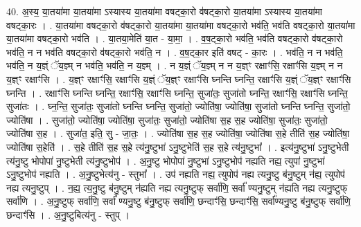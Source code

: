 \documentclass[17pt]{extarticle}
\begin{document}
40. अ॒स्य॒ या॒तया॑मा या॒तया॑मा ऽस्यास्य या॒तया॑मा वषट्का॒रो व॑षट्का॒रो या॒तया॑मा ऽस्यास्य या॒तया॑मा वषट्का॒रः । . या॒तया॑मा वषट्का॒रो व॑षट्का॒रो या॒तया॑मा या॒तया॑मा वषट्का॒रो भव॑ति॒ भव॑ति वषट्का॒रो या॒तया॑मा या॒तया॑मा वषट्का॒रो भव॑ति । . या॒तया॒मेति॑ या॒त - या॒मा॒ । . व॒ष॒ट्का॒रो भव॑ति॒ भव॑ति वषट्का॒रो व॑षट्का॒रो भव॑ति॒ न न भव॑ति वषट्का॒रो व॑षट्का॒रो भव॑ति॒ न । . व॒ष॒ट्का॒र इति॑ वषट् - का॒रः । . भव॑ति॒ न न भव॑ति॒ भव॑ति॒ न य॒ज्ञ्ं ॅय॒ज्ञ्म् न भव॑ति॒ भव॑ति॒ न य॒ज्ञ्म् । . न य॒ज्ञ्ं ॅय॒ज्ञ्म् न न य॒ज्ञ्ꣳ रक्षाꣳ॑सि॒ रक्षाꣳ॑सि य॒ज्ञ्म् न न य॒ज्ञ्ꣳ रक्षाꣳ॑सि । . य॒ज्ञ्ꣳ रक्षाꣳ॑सि॒ रक्षाꣳ॑सि य॒ज्ञ्ं ॅय॒ज्ञ्ꣳ रक्षाꣳ॑सि घ्नन्ति घ्नन्ति॒ रक्षाꣳ॑सि य॒ज्ञ्ं ॅय॒ज्ञ्ꣳ रक्षाꣳ॑सि घ्नन्ति । . रक्षाꣳ॑सि घ्नन्ति घ्नन्ति॒ रक्षाꣳ॑सि॒ रक्षाꣳ॑सि घ्नन्ति॒ सुजा॑तः॒ सुजा॑तो घ्नन्ति॒ रक्षाꣳ॑सि॒ रक्षाꣳ॑सि घ्नन्ति॒ सुजा॑तः । . घ्न॒न्ति॒ सुजा॑तः॒ सुजा॑तो घ्नन्ति घ्नन्ति॒ सुजा॑तो॒ ज्योति॑षा॒ ज्योति॑षा॒ सुजा॑तो घ्नन्ति घ्नन्ति॒ सुजा॑तो॒ ज्योति॑षा । . सुजा॑तो॒ ज्योति॑षा॒ ज्योति॑षा॒ सुजा॑तः॒ सुजा॑तो॒ ज्योति॑षा स॒ह स॒ह ज्योति॑षा॒ सुजा॑तः॒ सुजा॑तो॒ ज्योति॑षा स॒ह । . सुजा॑त॒ इति॒ सु - जा॒तः॒ । . ज्योति॑षा स॒ह स॒ह ज्योति॑षा॒ ज्योति॑षा स॒हे तीति॑ स॒ह ज्योति॑षा॒ ज्योति॑षा स॒हेति॑ । . स॒हे तीति॑ स॒ह स॒हे त्य॑नु॒ष्टुभा॑ ऽनु॒ष्टुभेति॑ स॒ह स॒हे त्य॑नु॒ष्टुभा᳚ । . इत्य॑नु॒ष्टुभा॑ ऽनु॒ष्टुभेती त्य॑नु॒ष्टु भोपोपा॑ नु॒ष्टुभेती त्य॑नु॒ष्टुभोप॑ । . अ॒नु॒ष्टु भोपोपा॑ नु॒ष्टुभा॑ ऽनु॒ष्टुभोप॑ नह्यति नह्य॒ त्युपा॑ नु॒ष्टुभा॑ ऽनु॒ष्टुभोप॑ नह्यति । . अ॒नु॒ष्टुभेत्य॑नु - स्तुभा᳚ । . उप॑ नह्यति नह्य॒ त्युपोप॑ नह्य त्यनु॒ष्टु ब॑नु॒ष्टुम् न॑ह्य॒ त्युपोप॑ नह्य त्यनु॒ष्टुप् । . न॒ह्य॒ त्य॒नु॒ष्टु ब॑नु॒ष्टुम् न॑ह्यति नह्य त्यनु॒ष्टुफ् सर्वा॑णि॒ सर्वा᳚ ण्यनु॒ष्टुम् न॑ह्यति नह्य त्यनु॒ष्टुफ् सर्वा॑णि । . अ॒नु॒ष्टुफ् सर्वा॑णि॒ सर्वा᳚ ण्यनु॒ष्टु ब॑नु॒ष्टुफ् सर्वा॑णि॒ छन्दाꣳ॑सि॒ छन्दाꣳ॑सि॒ सर्वा᳚ण्यनु॒ष्टु ब॑नु॒ष्टुफ् सर्वा॑णि॒ छन्दाꣳ॑सि । . अ॒नु॒ष्टुबित्य॑नु - स्तुप् । \newline
\pagebreak
{}
\end{document}
